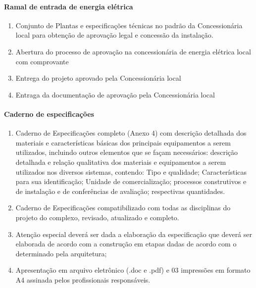 \paragraph{Ramal de entrada de energia elétrica}
\begin{enumerate}

\item Conjunto de Plantas e especificações técnicas no padrão da Concessionária local para obtenção de aprovação legal e concessão da instalação.

\item Abertura do processo de aprovação na concessionária de energia elétrica local com comprovante

\item Entrega do projeto aprovado pela Concessionária local

\item Entraga da documentação de aprovação pela Concessionária local
\end{enumerate}


\paragraph{Caderno de especificações}
	\begin{enumerate}

		\item Caderno de Especificações completo (Anexo 4) com descrição detalhada dos materiais e características básicas dos principais equipamentos a serem utilizados, incluindo outros elementos que se façam necessários: descrição detalhada e relação qualitativa dos materiais e equipamentos a serem utilizados nos diversos sistemas, contendo: Tipo e qualidade; Características para sua identificação; Unidade de comercialização; processos construtivos e de instalação e de conferências de avaliação; respectivas quantidades.

		\item Caderno de Especificações compatibilizado com todas as disciplinas do projeto do complexo, revisado, atualizado e completo.

		\item Atenção especial deverá ser dada a elaboração da especificação que deverá ser elaborada de acordo com a construção em etapas dadas de acordo com o determinado pela arquitetura;

		\item Apresentação em arquivo eletrônico (.doc e .pdf) e 03 impressões em formato A4 assinada pelos profissionais responsáveis.
	\end{enumerate}

